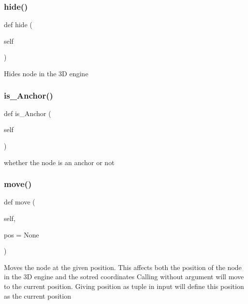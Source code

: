 \subsubsection{\texorpdfstring{hide()}{hide()}}
{\footnotesize\ttfamily def hide (\begin{DoxyParamCaption}\item[{}]{self }\end{DoxyParamCaption})}

\begin{DoxyVerb}Hides node in the 3D engine\end{DoxyVerb}
 \mbox{\label{class_rendering_1_1_rendered_node_ad6085aa230d9fd00409dd650b0b549bc}} 
\subsubsection{\texorpdfstring{is\+\_\+\+Anchor()}{is\_Anchor()}}
{\footnotesize\ttfamily def is\+\_\+\+Anchor (\begin{DoxyParamCaption}\item[{}]{self }\end{DoxyParamCaption})}

\begin{DoxyVerb}whether the node is an anchor or not\end{DoxyVerb}
 \mbox{\label{class_rendering_1_1_rendered_node_a6feb931cbee18d2d59c63986d969cc22}} 
\subsubsection{\texorpdfstring{move()}{move()}}
{\footnotesize\ttfamily def move (\begin{DoxyParamCaption}\item[{}]{self,  }\item[{}]{pos = {\ttfamily None} }\end{DoxyParamCaption})}

\begin{DoxyVerb}Moves the node at the given position.
This affects both the position of the node in the 3D engine and the sotred coordinates
Calling without argument will move to the current position.
Giving position as tuple in input will define this position as the current position\end{DoxyVerb}
 \mbox{\label{class_rendering_1_1_rendered_node_ab4f4398c3f210fe4ea6e720401357691}} 
